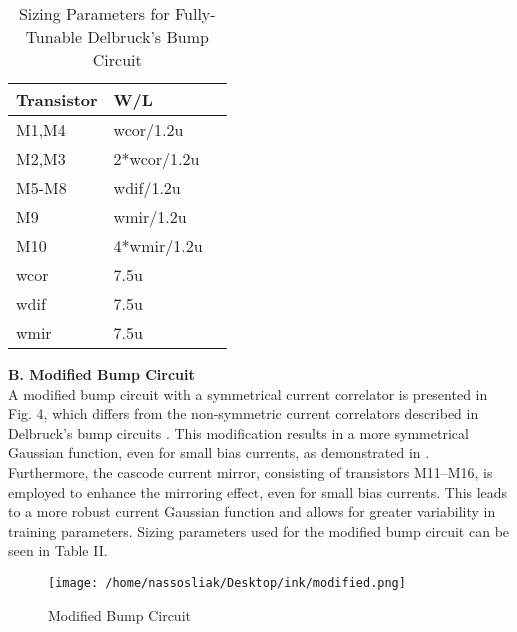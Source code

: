 \documentclass[conference]{IEEEtran}
\begin{document}
\begin{table}[!h]
    \centering
\large
\begin{tabular}{|p{2.5cm}|p{2.5cm}|p{2.5cm}|}
        \hline
        \textbf{Transistor} & \textbf{W/L}\\
        \hline
        M1,M4   &  wcor/1.2u\\
        \hline
         M2,M3   & 2*wcor/1.2u\\
        \hline
         M5-M8   &  wdif/1.2u\\
        \hline
         M9   & wmir/1.2u \\
        \hline
         M10   &   4*wmir/1.2u\\
        \hline
  wcor &   7.5u\\
        \hline
  wdif  &   7.5u\\
        \hline
  wmir   &   7.5u\\
        \hline
    \end{tabular}
\vspace{0.5cm}
    \caption{Sizing Parameters for Fully-Tunable Delbruck's Bump Circuit}

\end{table}
\textbf{B. Modified Bump Circuit} \\
A modified bump circuit with a symmetrical current correlator is presented in Fig. 4, which differs from the non-symmetric current correlators described in Delbruck's bump circuits \cite{155225}. This modification results in a more symmetrical Gaussian function, even for small bias currents, as demonstrated in \cite{ALIMISIS2022105510}. Furthermore, the cascode current mirror, consisting of transistors M11–M16, is employed to enhance the mirroring effect, even for small bias currents. This leads to a more robust current Gaussian function and allows for greater variability in training parameters. Sizing parameters used for the modified bump circuit can be seen in Table II.\\

\begin{figure}[!h]
    \centering
    \texttt{[image: /home/nassosliak/Desktop/ink/modified.png]}
    \caption{Modified Bump Circuit}
\end{figure}
\end{document}
